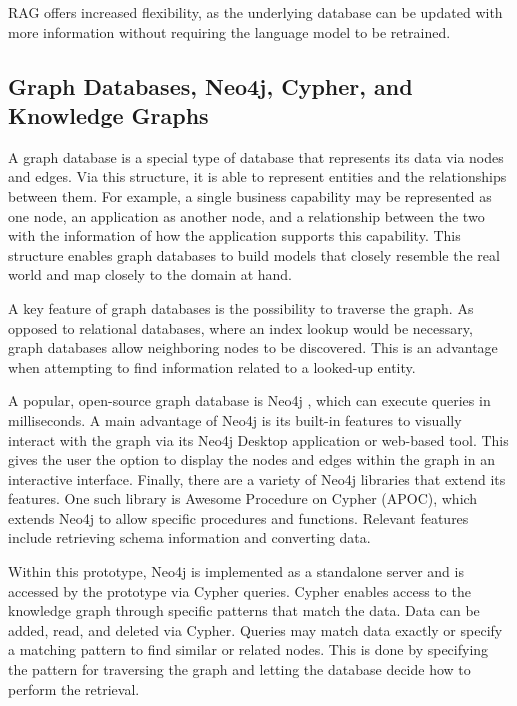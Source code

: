 RAG offers increased flexibility, as the underlying database can be updated with more information without requiring the language model to be retrained. \cite{zhao2026retrieval}

\subsection{Graph Databases, Neo4j, Cypher, and Knowledge Graphs}
\label{sub:background:graphdb}
A graph database is a special type of database that represents its data via nodes and edges. Via this structure, it is able to represent entities and the relationships between them. \cite[pg. 1]{robinson2015graph} For example, a single business capability may be represented as one node, an application as another node, and a relationship between the two with the information of how the application supports this capability. This structure enables graph databases to build models that closely resemble the real world and map closely to the domain at hand. \cite[pg. 6 and 38]{robinson2015graph}

A key feature of graph databases is the possibility to traverse the graph. As opposed to relational databases, where an index lookup would be necessary, graph databases allow neighboring nodes to be discovered. This is an advantage when attempting to find information related to a looked-up entity. \cite[pgs. 34-35]{van2014learning}

A popular, open-source graph database is Neo4j \cite{neo4j_2026}, which can execute queries in milliseconds. \cite{robinson2015graph} A main advantage of Neo4j is its built-in features to visually interact with the graph via its Neo4j Desktop application or web-based tool.  \cite{van2014learning} This gives the user the option to display the nodes and edges within the graph in an interactive interface. Finally, there are a variety of Neo4j libraries that extend its features. One such library is Awesome Procedure on Cypher (APOC), which extends Neo4j to allow specific procedures and functions. Relevant features include retrieving schema information and converting data. \cite{neo4j_apoc_meta_schema, neo4j_apoc_load_xml} 

Within this prototype, Neo4j is implemented as a standalone server and is accessed by the prototype via Cypher queries.  \cite[pgs. 27 and 77]{robinson2015graph} Cypher enables access to the knowledge graph through specific patterns that match the data. Data can be added, read, and deleted via Cypher. Queries may match data exactly or specify a matching pattern to find similar or related nodes. This is done by specifying the pattern for traversing the graph and letting the database decide how to perform the retrieval. \cite[pg. 27]{robinson2015graph}\cite[pg. 49]{van2014learning}

